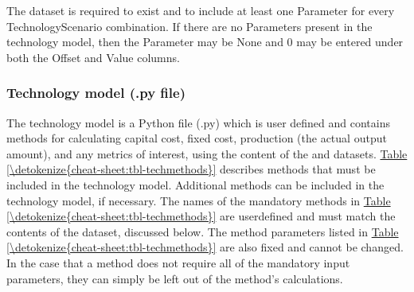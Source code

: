 \documentclass[letterpaper,10pt,english]{sphinxmanual}
\begin{document}
\sphinxAtStartPar
{} The  dataset is required to exist and to include at least one Parameter for every Technology\sphinxhyphen{}Scenario combination. If there are no Parameters present in the technology model, then the Parameter may be None and 0 may be entered under both the Offset and Value columns.


\subsubsection{Technology model (.py file)}
\label{\detokenize{cheat-sheet:technology-model-py-file}}
\sphinxAtStartPar
The technology model is a Python file (.py) which is user defined and contains methods for calculating capital cost, fixed cost, production (the actual output amount), and any metrics of interest, using the content of the  and  datasets. \hyperref[\detokenize{cheat-sheet:tbl-techmethods}]{Table \ref{\detokenize{cheat-sheet:tbl-techmethods}}} describes methods that must be included in the technology model. Additional methods can be included in the technology model, if necessary. The names of the mandatory methods in \hyperref[\detokenize{cheat-sheet:tbl-techmethods}]{Table \ref{\detokenize{cheat-sheet:tbl-techmethods}}} are user\sphinxhyphen{}defined and must match the contents of the  dataset, discussed below. The method parameters listed in \hyperref[\detokenize{cheat-sheet:tbl-techmethods}]{Table \ref{\detokenize{cheat-sheet:tbl-techmethods}}} are also fixed and cannot be changed. In the case that a method does not require all of the mandatory input parameters, they can simply be left out of the method’s calculations.
\end{document}
